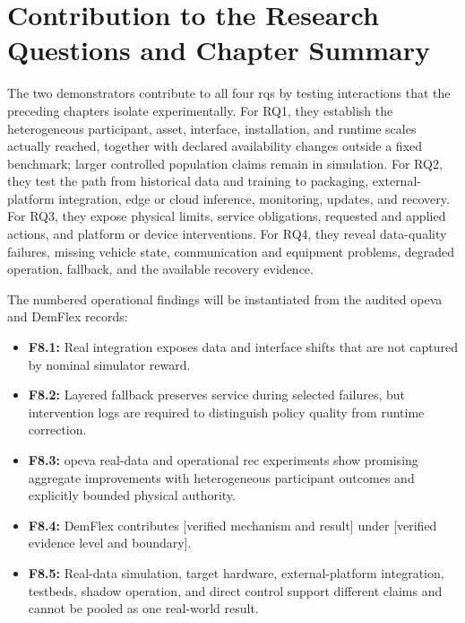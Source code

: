 \section{Contribution to the Research Questions and Chapter Summary}
\label{sec:real-rq-summary}
\label{sec:rw-rqs}

The two demonstrators contribute to all four \glspl{rq} by testing interactions that the preceding chapters isolate experimentally. For RQ1, they establish the heterogeneous participant, asset, interface, installation, and runtime scales actually reached, together with declared availability changes outside a fixed benchmark; larger controlled population claims remain in simulation. For RQ2, they test the path from historical data and training to packaging, external-platform integration, edge or cloud inference, monitoring, updates, and recovery. For RQ3, they expose physical limits, service obligations, requested and applied actions, and platform or device interventions. For RQ4, they reveal data-quality failures, missing vehicle state, communication and equipment problems, degraded operation, fallback, and the available recovery evidence.

\begin{draftonly}
The numbered operational findings will be instantiated from the audited \gls{opeva} and DemFlex records:

\begin{itemize}
  \item \textbf{F8.1:} Real integration exposes data and interface shifts that are not captured by nominal simulator reward.
  \item \textbf{F8.2:} Layered fallback preserves service during selected failures, but intervention logs are required to distinguish policy quality from runtime correction.
  \item \textbf{F8.3:} \gls{opeva} real-data and operational \gls{rec} experiments show promising aggregate improvements with heterogeneous participant outcomes and explicitly bounded physical authority.
  \item \textbf{F8.4:} DemFlex contributes [verified mechanism and result] under [verified evidence level and boundary].
  \item \textbf{F8.5:} Real-data simulation, target hardware, external-platform integration, testbeds, shadow operation, and direct control support different claims and cannot be pooled as one real-world result.
\end{itemize}
\end{draftonly}

